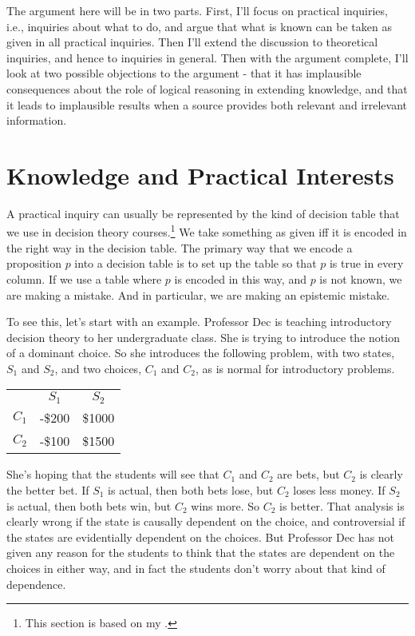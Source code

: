 \documentclass[11pt,]{book}
\let\rmarkdownfootnote\footnote%
\def\footnote{\protect\rmarkdownfootnote}
\def\toprule{}
\def\bottomrule{}
\begin{document}
The argument here will be in two parts. First, I'll focus on practical inquiries, i.e., inquiries about what to do, and argue that what is known can be taken as given in all practical inquiries. Then I'll extend the discussion to theoretical inquiries, and hence to inquiries in general. Then with the argument complete, I'll look at two possible objections to the argument - that it has implausible consequences about the role of logical reasoning in extending knowledge, and that it leads to implausible results when a source provides both relevant and irrelevant information.

\hypertarget{structure}{%
\section{Knowledge and Practical Interests}\label{structure}}

A practical inquiry can usually be represented by the kind of decision table that we use in decision theory courses.\footnote{This section is based on my \citeyearpar[sect 1.1]{Weatherson2012}.} We take something as given iff it is encoded in the right way in the decision table. The primary way that we encode a proposition \(p\) into a decision table is to set up the table so that \(p\) is true in every column. If we use a table where \(p\) is encoded in this way, and \(p\) is not known, we are making a mistake. And in particular, we are making an epistemic mistake.

To see this, let's start with an example. Professor Dec is teaching introductory decision theory to her undergraduate class. She is trying to introduce the notion of a dominant choice. So she introduces the following problem, with two states, \(S_1\) and \(S_2\), and two choices, \(C_1\) and \(C_2\), as is normal for introductory problems.

\begin{longtable}[]{@{}lcc@{}}
\toprule
\endhead
& \(S_1\) & \(S_2\)\tabularnewline
\(C_1\) & -\$200 & \$1000\tabularnewline
\(C_2\) & -\$100 & \$1500\tabularnewline
\bottomrule
\end{longtable}

She's hoping that the students will see that \(C_1\) and \(C_2\) are bets, but \(C_2\) is clearly the better bet. If \(S_1\) is actual, then both bets lose, but \(C_2\) loses less money. If \(S_2\) is actual, then both bets win, but \(C_2\) wins more. So \(C_2\) is better. That analysis is clearly wrong if the state is causally dependent on the choice, and controversial if the states are evidentially dependent on the choices. But Professor Dec has not given any reason for the students to think that the states are dependent on the choices in either way, and in fact the students don't worry about that kind of dependence.
\end{document}
